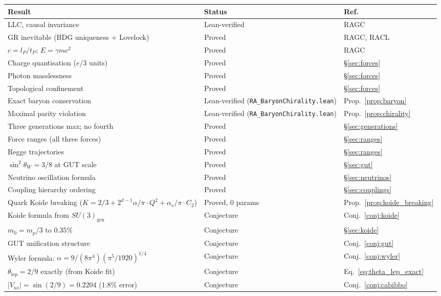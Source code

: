 \documentclass[11pt,a4paper]{article}
\begin{document}
\begin{center}
\renewcommand{\arraystretch}{1.25}
\begin{tabular}{p{5.5cm}ll}
\toprule
Result & Status & Ref. \\
\midrule
LLC, causal invariance & Lean-verified & RAGC \\
GR inevitable (BDG uniqueness + Lovelock) & Proved & RAGC, RACL \\
$c = l_P/t_P$; $E = \gamma mc^2$ & Proved & RAGC \\
Charge quantisation ($e/3$ units) & Proved & \S\ref{sec:forces} \\
Photon masslessness & Proved & \S\ref{sec:forces} \\
Topological confinement & Proved & \S\ref{sec:forces} \\
Exact baryon conservation & Lean-verified (\texttt{RA\_BaryonChirality.lean}) & Prop.~\ref{prop:baryon} \\
Maximal parity violation & Lean-verified (\texttt{RA\_BaryonChirality.lean}) & Prop.~\ref{prop:chirality} \\
Three generations max; no fourth & Proved & \S\ref{sec:generations} \\
Force ranges (all three forces) & Proved & \S\ref{sec:ranges} \\
Regge trajectories & Proved & \S\ref{sec:ranges} \\
$\sin^2\theta_W = 3/8$ at GUT scale & Proved & \S\ref{sec:gut} \\
Neutrino oscillation formula & Proved & \S\ref{sec:neutrinos} \\
Coupling hierarchy ordering & Proved & \S\ref{sec:couplings} \\
Quark Koide breaking ($K = 2/3 + 2^{d-1}\alpha/\pi \cdot Q^2 + \alpha_s/\pi \cdot C_2$) & Proved, 0 params & Prop.~\ref{prop:koide_breaking} \\
\midrule
Koide formula from $SU(3)_{\mathrm{gen}}$ & Conjecture & Conj.~\ref{conj:koide} \\
$m_0 = m_p/3$ to $0.35\%$ & Conjecture & \S\ref{sec:koide} \\
GUT unification structure & Conjecture & Conj.~\ref{conj:gut} \\
Wyler formula: $\alpha = 9/(8\pi^4)(\pi^5/1920)^{1/4}$ & Conjecture & Conj.~\ref{conj:wyler} \\
$\theta_{\mathrm{lep}} = 2/9$ exactly (from Koide fit) & Conjecture & Eq.~\eqref{eq:theta_lep_exact} \\
$|V_{us}| = \sin(2/9) = 0.2204$ ($1.8\%$ error) & Conjecture & Conj.~\ref{conj:cabibbo} \\

\end{tabular}
\end{center}
\end{document}
